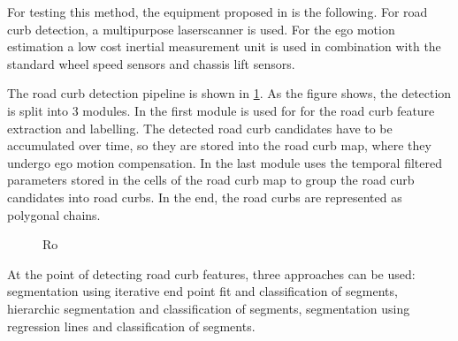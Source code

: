 \documentclass[conference]{IEEEtran}
\begin{document}
For testing this method, the equipment proposed in \cite{stereo} is the following. For road curb detection, a multipurpose laserscanner is used. For the ego motion estimation a low cost inertial measurement unit is used in combination with the standard wheel speed sensors and chassis lift sensors. 

The road curb detection pipeline is shown in \ref{fig1}. As the figure shows, the detection is split into 3 modules. In the first module is used for for the road curb feature extraction and labelling. The detected road curb candidates have to be accumulated over time, so they are stored into the road curb map, where they undergo ego motion compensation. In the last module uses the temporal filtered parameters stored in the cells of the road curb map to group the road curb candidates into road curbs. In the end, the road curbs are represented as polygonal chains.  

\begin{figure}[ht]
	\centering
	\caption{Ro}
	\label{fig1}
\end{figure}
  
At the point of detecting road curb features, three approaches can be used: segmentation using iterative end point fit and classification of segments, hierarchic segmentation and classification of segments, segmentation using regression lines and classification of segments.
\end{document}

